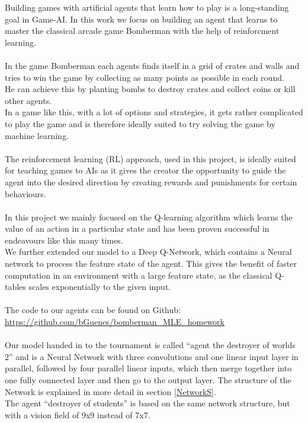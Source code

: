 
Building games with artificial agents that learn how to play is a long-standing goal in Game-AI. In this work we focus on building an agent that learns to master the classical arcade game Bomberman with the help of reinforcment learning.\\ \\
In the game Bomberman each agents finds itself in a grid of crates and walls and tries to win the game by collecting as many points as possible in each round.\\
He can achieve this by planting bombs to destroy crates and collect coins or kill other agents. \\
In a game like this, with a lot of options and strategies, it gets rather complicated to play the game and is therefore ideally suited to try solving the game by machine learning.\\ \\
The reinforcement learning (RL) approach, used in this project, is ideally suited for teaching games to AIs as it gives the creator the opportunity to guide the agent into the desired direction by creating rewards and punishments for certain behaviours.\\ \\
In this project we mainly focused on the Q-learning algorithm which learns the value of an action in a particular state and has been proven successful in endeavours like this many times. \\
We further extended our model to a Deep Q-Network, which contains a Neural network to process the feature state of the agent. This gives the benefit of faster computation in an environment with a large feature state, as the classical Q-tables scales exponentially to the given input.\\ \\
The code to our agents can be found on Github: \\
\url{https://github.com/bGuenes/bomberman_MLE_homework} \\ \\
Our model handed in to the tournament is called ``agent the destroyer of worlds 2'' and is a Neural Network with three convolutions and one linear input layer in parallel, followed by four parallel linear inputs, which then merge together into one fully connected layer and then go to the output layer. The structure of the Network is explained in more detail in section \ref{NetworkS}. \\
The agent ``destroyer of students'' is based on the same network structure, but with a vision field of 9x9 instead of 7x7.\\

